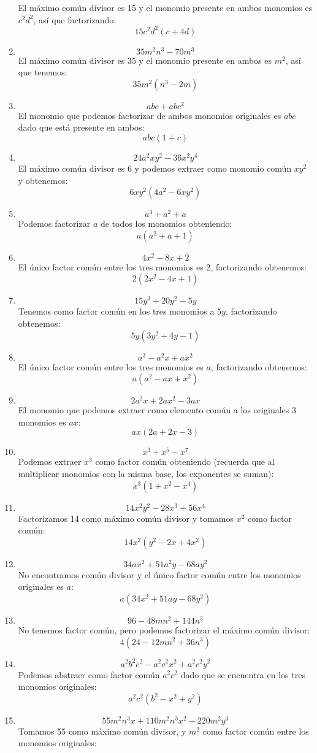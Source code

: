 \documentclass[12pt]{article}
\begin{document}
\begin{enumerate}[label=\bfseries Ejercicio \arabic*:]
El máximo común divisor es 15 y el monomio presente en ambos monomios es $c^2d^2$, así que factorizando:
$$15c^2d^2(c + 4d)$$
  \item $$35m^2n^3 - 70m^3$$
El máximo común divisor es 35 y el monomio presente en ambos es $m^2$, así que tenemos:
$$35m^2(n^3 - 2m)$$
  \item $$abc + abc^2$$
El monomio que podemos factorizar de ambos monomios originales es $abc$ dado que está presente en ambos:
$$abc(1 + c)$$
  \item $$24a^2xy^2 -36x^2y^4$$
El máximo común divisor es 6 y podemos extraer como monomio común $xy^2$ y obtenemos:
$$6xy^2(4a^2 - 6xy^2)$$
  \item $$a^3 + a^2 + a$$
Podemos factorizar $a$ de todos los monomios obteniendo:
$$a(a^2 + a +1)$$
  \item $$4x^2 - 8x + 2$$
El único factor común entre los tres monomios es 2, factorizando obtenemos:
$$2(2x^2 - 4x + 1)$$
  \item $$15y^3 + 20y^2 - 5y$$
Tenemos como factor común en los tres monomios a $5y$, factorizando obtenemos:
$$5y(3y^2 + 4y - 1)$$
  \item $$a^3 -a^2x + ax^2$$
El único factor común entre los tres monomios es $a$, factorizando obtenemos:
$$a(a^2 - ax + x^2)$$
  \item $$2a^2x +2ax^2 - 3ax$$
El monomio que podemos extraer como elemento común a los originales 3 monomios es $ax$:
$$ax(2a + 2x - 3)$$
  \item $$x^3 +x^5 -x^7$$
Podemos extraer $x^3$ como factor común obteniendo (recuerda que al multiplicar monomios con la misma base, los exponentes se suman):
$$x^3(1 + x^2 - x^4)$$
  \item $$14x^2y^2 -28x^3 + 56x^4$$
Factorizamos 14 como máximo común divisor y tomamos $x^2$ como factor común:
$$14x^2(y^2 - 2x + 4x^2)$$
  \item $$34ax^2 + 51a^2y - 68ay^2$$
No encontramos común divisor y el único factor común entre los monomios originales es $a$:
$$a(34x^2 + 51ay - 68y^2)$$
  \item $$96 - 48mn^2 + 144n^3$$
No tenemos factor común, pero podemos factorizar el máximo común divisor:
$$4(24 - 12mn^2 + 36n^3)$$
  \item $$a^2b^2c^2 - a^2c^2x^2 + a^2c^2y^2$$
Podemos abstraer como factor común $a^2c^2$ dado que se encuentra en los tres monomios originales:
$$a^2c^2(b^2 - x^2 + y^2)$$
  \item $$55m^2n^3x + 110m^2n^3x^2 - 220m^2y^3$$
Tomamos 55 como máximo común divisor, y $m^2$ como factor común entre los monomios originales:

\end{enumerate}
\end{document}

